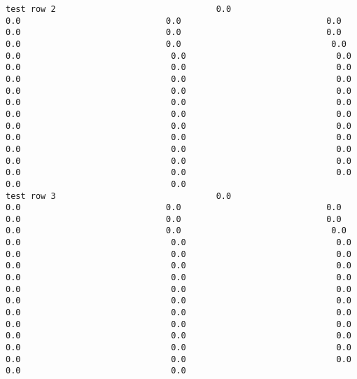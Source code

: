 \documentclass[11pt]{article}
\begin{document}
\begin{verbatim}
test row 2                                0.0                             0.0                             0.0                             0.0                             0.0                             0.0                             0.0                             0.0                             0.0                              0.0                              0.0                              0.0                              0.0                              0.0                              0.0                              0.0                              0.0                              0.0                              0.0                              0.0                              0.0                              0.0                              0.0                              0.0                              0.0                              0.0                              0.0                              0.0                              0.0                              0.0                              0.0                              0.0                              0.0                              0.0                              0.0                              0.0                              0.0                              0.0                              0.0                              0.0                              0.0                              0.0                              0.0                              0.0                              0.0
test row 3                                0.0                             0.0                             0.0                             0.0                             0.0                             0.0                             0.0                             0.0                             0.0                              0.0                              0.0                              0.0                              0.0                              0.0                              0.0                              0.0                              0.0                              0.0                              0.0                              0.0                              0.0                              0.0                              0.0                              0.0                              0.0                              0.0                              0.0                              0.0                              0.0                              0.0                              0.0                              0.0                              0.0                              0.0                              0.0                              0.0                              0.0                              0.0                              0.0                              0.0                              0.0                              0.0                              0.0                              0.0                              0.0

\end{verbatim}
\end{document}
